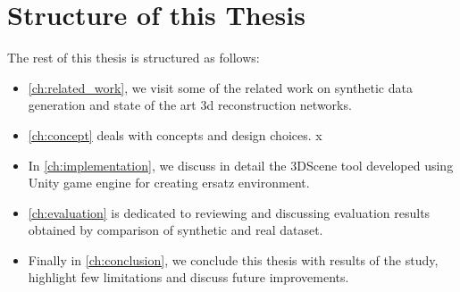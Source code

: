 \section{Structure of this Thesis}

The rest of this thesis is structured as follows:

\begin{itemize}
    \item \autoref{ch:related_work}, we visit some of the related work on synthetic data generation and state of the art 3d reconstruction networks.

    \item \autoref{ch:concept} deals with concepts and design choices.
x
    \item In \autoref{ch:implementation}, we discuss in detail the 3DScene tool developed using Unity game engine for creating ersatz environment.

    \item  \autoref{ch:evaluation} is dedicated to reviewing and discussing evaluation results obtained by comparison of synthetic and real dataset.

    \item Finally in \autoref{ch:conclusion}, we conclude this thesis with results of the study, highlight few limitations and discuss future improvements.

\end{itemize}